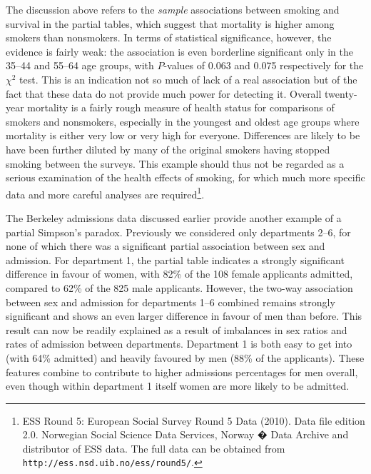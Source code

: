 \documentclass[11pt,a4paper,openany]{book}
\let\rmarkdownfootnote\footnote%
\def\footnote{\protect\rmarkdownfootnote}
\begin{document}
The discussion above refers to the \emph{sample} associations between
smoking and survival in the partial tables, which suggest that mortality
is higher among smokers than nonsmokers. In terms of statistical
significance, however, the evidence is fairly weak: the association is
even borderline significant only in the 35--44 and 55--64 age groups,
with \(P\)-values of 0.063 and 0.075 respectively for the \(\chi^{2}\)
test. This is an indication not so much of lack of a real association
but of the fact that these data do not provide much power for detecting
it. Overall twenty-year mortality is a fairly rough measure of health
status for comparisons of smokers and nonsmokers, especially in the
youngest and oldest age groups where mortality is either very low or
very high for everyone. Differences are likely to be have been further
diluted by many of the original smokers having stopped smoking between
the surveys. This example should thus not be regarded as a serious
examination of the health effects of smoking, for which much more
specific data and more careful analyses are required\footnote{ESS Round
  5: European Social Survey Round 5 Data (2010). Data file edition 2.0.
  Norwegian Social Science Data Services, Norway � Data Archive and
  distributor of ESS data. The full data can be obtained from
  \texttt{http://ess.nsd.uib.no/ess/round5/}.}.

The Berkeley admissions data discussed earlier provide another example
of a partial Simpson's paradox. Previously we considered only
departments 2--6, for none of which there was a significant partial
association between sex and admission. For department 1, the partial
table indicates a strongly significant difference in favour of women,
with 82\% of the 108 female applicants admitted, compared to 62\% of the
825 male applicants. However, the two-way association between sex and
admission for departments 1--6 combined remains strongly significant and
shows an even larger difference in favour of men than before. This
result can now be readily explained as a result of imbalances in sex
ratios and rates of admission between departments. Department 1 is both
easy to get into (with 64\% admitted) and heavily favoured by men (88\%
of the applicants). These features combine to contribute to higher
admissions percentages for men overall, even though within department 1
itself women are more likely to be admitted.
\end{document}
